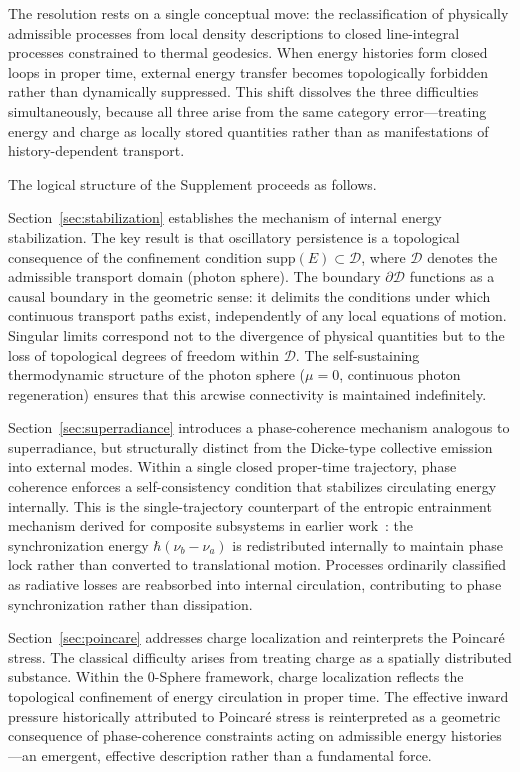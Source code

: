 \documentclass[12pt,a4paper]{article}
\begin{document}
The resolution rests on a single conceptual move: the reclassification of physically admissible processes from local density descriptions to closed line-integral processes constrained to thermal geodesics. When energy histories form closed loops in proper time, external energy transfer becomes topologically forbidden rather than dynamically suppressed. This shift dissolves the three difficulties simultaneously, because all three arise from the same category error---treating energy and charge as locally stored quantities rather than as manifestations of history-dependent transport.

The logical structure of the Supplement proceeds as follows.

Section~\ref{sec:stabilization} establishes the mechanism of internal energy stabilization. The key result is that oscillatory persistence is a topological consequence of the confinement condition $\mathrm{supp}(E) \subset \mathcal{D}$, where $\mathcal{D}$ denotes the admissible transport domain (photon sphere). The boundary $\partial\mathcal{D}$ functions as a causal boundary in the geometric sense: it delimits the conditions under which continuous transport paths exist, independently of any local equations of motion. Singular limits correspond not to the divergence of physical quantities but to the loss of topological degrees of freedom within $\mathcal{D}$. The self-sustaining thermodynamic structure of the photon sphere ($\mu = 0$, continuous photon regeneration) ensures that this arcwise connectivity is maintained indefinitely.

Section~\ref{sec:superradiance} introduces a phase-coherence mechanism analogous to superradiance, but structurally distinct from the Dicke-type collective emission into external modes. Within a single closed proper-time trajectory, phase coherence enforces a self-consistency condition that stabilizes circulating energy internally. This is the single-trajectory counterpart of the entropic entrainment mechanism derived for composite subsystems in earlier work~\cite{hanamura18437010}: the synchronization energy $\hbar(\nu_b - \nu_a)$ is redistributed internally to maintain phase lock rather than converted to translational motion. Processes ordinarily classified as radiative losses are reabsorbed into internal circulation, contributing to phase synchronization rather than dissipation.

Section~\ref{sec:poincare} addresses charge localization and reinterprets the Poincar\'e stress. The classical difficulty arises from treating charge as a spatially distributed substance. Within the 0-Sphere framework, charge localization reflects the topological confinement of energy circulation in proper time. The effective inward pressure historically attributed to Poincar\'e stress is reinterpreted as a geometric consequence of phase-coherence constraints acting on admissible energy histories---an emergent, effective description rather than a fundamental force.
\end{document}
